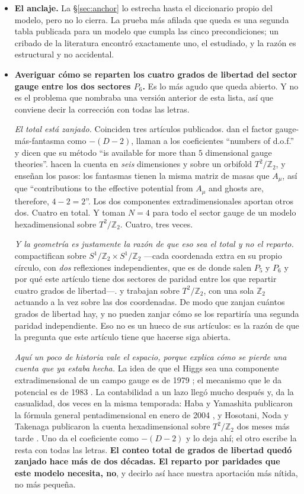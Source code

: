 \documentclass[11pt,a4paper]{article}
\newcommand{\ZZ}{\mathbb{Z}}
\begin{document}
\begin{itemize}\itemsep2pt
\item \textbf{El anclaje.} La \S\ref{sec:anchor} lo estrecha hasta el diccionario propio del modelo,
pero no lo cierra. La prueba más afilada que queda es una segunda tabla publicada para un modelo que
cumpla las cinco precondiciones; un cribado de la literatura encontró exactamente uno, el estudiado, y
la razón es estructural y no accidental.
\item \textbf{Averiguar cómo se reparten los cuatro grados de libertad del sector gauge entre los
dos sectores $P_6$.} Es lo más agudo que queda abierto. Y no es el problema que nombraba una
versión anterior de esta lista, así que conviene decir la corrección con todas las letras.

\emph{El total está zanjado.} Coinciden tres artículos publicados. \cite{HY04} dan el factor
gauge-más-fantasma como $-(D-2)$, llaman a los coeficientes ``numbers of d.o.f.'' y dicen que su
método ``is available for more than $5$ dimensional gauge theories''. \cite{HNT} hacen la cuenta en
\emph{seis} dimensiones y sobre un orbifold $T^2/\ZZ_2$, y enseñan los pasos: los fantasmas tienen la
misma matriz de masas que $A_\mu$, así que ``contributions to the effective potential from $A_\mu$
and ghosts are, therefore, $4-2=2$''. Los dos componentes extradimensionales aportan otros dos.
Cuatro en total. Y \cite{AHMN} toman $N=4$ para todo el sector gauge de un modelo
hexadimensional sobre $T^2/\ZZ_2$. Cuatro, tres veces.

\emph{Y la geometría es justamente la razón de que eso sea el total y no el reparto.} \cite{KM25}
compactifican sobre $S^1/\ZZ_2\times S^1/\ZZ_2$ ---cada coordenada extra en su propio círculo, con
\emph{dos} reflexiones independientes, que es de donde salen $P_5$ y $P_6$ y por qué este artículo
tiene dos sectores de paridad entre los que repartir cuatro grados de libertad---. \cite{HNT} y
\cite{AHMN} trabajan sobre $T^2/\ZZ_2$, con una sola $\ZZ_2$ actuando a la vez sobre las dos
coordenadas. De modo que zanjan cuántos grados de libertad hay, y no pueden zanjar cómo se los
repartiría una segunda paridad independiente. Eso no es un hueco de sus artículos: es la razón de
que la pregunta que este artículo tiene que hacerse siga abierta.

\emph{Aquí un poco de historia vale el espacio, porque explica cómo se pierde una cuenta que ya
estaba hecha.} La idea de que el Higgs sea una componente extradimensional de un campo gauge es de
1979 \cite{Manton}; el mecanismo que le da potencial es de 1983 \cite{Hosotani}. La contabilidad a
un lazo llegó mucho después y, da la casualidad, dos veces en la misma temporada: Haba y Yamashita
publicaron la fórmula general pentadimensional en enero de 2004 \cite{HY04}, y Hosotani, Noda y
Takenaga publicaron la cuenta hexadimensional sobre $T^2/\ZZ_2$ dos meses más tarde \cite{HNT}.
Uno da el coeficiente como $-(D-2)$ y lo deja ahí; el otro escribe la resta con todas las letras.
\textbf{El conteo total de grados de libertad quedó zanjado hace más de dos décadas. El reparto por
paridades que este modelo necesita, no}, y decirlo así hace nuestra aportación más nítida, no más
pequeña.


\end{itemize}
\end{document}
